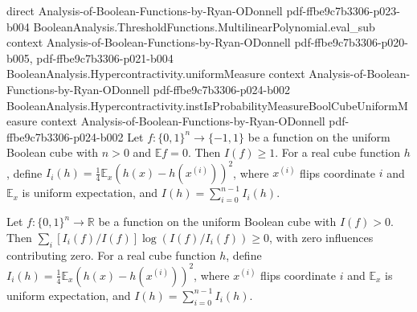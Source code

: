 \begin{lemma}
  {direct}
  {Analysis-of-Boolean-Functions-by-Ryan-ODonnell}
  {pdf-ffbe9c7b3306-p023-b004}
\proofstep
  {BooleanAnalysis.ThresholdFunctions.MultilinearPolynomial.eval_sub}
  {context}
  {Analysis-of-Boolean-Functions-by-Ryan-ODonnell}
  {pdf-ffbe9c7b3306-p020-b005,
    pdf-ffbe9c7b3306-p021-b004}
\proofstep
  {BooleanAnalysis.Hypercontractivity.uniformMeasure}
  {context}
  {Analysis-of-Boolean-Functions-by-Ryan-ODonnell}
  {pdf-ffbe9c7b3306-p024-b002}
\proofstep
  {BooleanAnalysis.Hypercontractivity.instIsProbabilityMeasureBoolCubeUniformMeasure}
  {context}
  {Analysis-of-Boolean-Functions-by-Ryan-ODonnell}
  {pdf-ffbe9c7b3306-p024-b002}
\label{KKL.balanced_totalInfluence_ge_one}
Let $f:\{0,1\}^n\to\{-1,1\}$ be a function on the uniform Boolean cube with $n>0$ and
$\mathbb Ef=0$. Then $I(f)\ge1$. For a real cube function $h$, define
$I_i(h)=\tfrac14\mathbb E_x(h(x)-h(x^{(i)}))^2$, where $x^{(i)}$ flips coordinate $i$
and $\mathbb E_x$ is uniform expectation, and $I(h)=\sum_{i=0}^{n-1}I_i(h)$.
\end{lemma}

\begin{lemma}
\leanok
{}
\label{KKL.influence_entropy_nonneg}
Let $f:\{0,1\}^n\to\mathbb R$ be a function on the uniform Boolean cube with $I(f)>0$.
Then $\sum_i[I_i(f)/I(f)]\log(I(f)/I_i(f))\ge0$, with zero influences contributing zero.
For a real cube function $h$, define $I_i(h)=\tfrac14\mathbb E_x(h(x)-h(x^{(i)}))^2$,
where $x^{(i)}$ flips coordinate $i$ and $\mathbb E_x$ is uniform expectation, and
$I(h)=\sum_{i=0}^{n-1}I_i(h)$.
\end{lemma}
